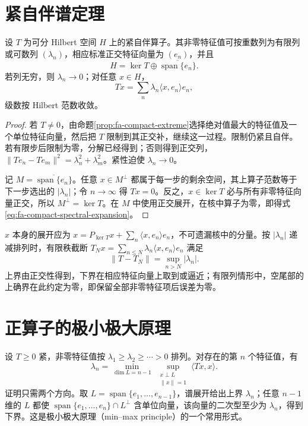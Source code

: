 \section{紧自伴谱定理}
\begin{theorem}\label{thm:fa-compact-spectral}
设 $T$ 为可分 Hilbert 空间 $H$ 上的紧自伴算子。其非零特征值可按重数列为有限列或可数列 $(\lambda_n)$，相应标准正交特征向量为 $(e_n)$，并且
\[
 H=\ker T\oplus\overline{\operatorname{span}\{e_n\}}.
\]
若列无穷，则 $\lambda_n\to0$；对任意 $x\in H$，
\begin{equation}
 Tx=\sum_n\lambda_n\langle x,e_n\rangle e_n,
 \label{eq:fa-compact-spectral-expansion}
\end{equation}
级数按 Hilbert 范数收敛。
\end{theorem}
\begin{proof}
若 $T\ne0$，由命题\ref{prop:fa-compact-extreme}选择绝对值最大的特征值及一个单位特征向量，然后把 $T$ 限制到其正交补，继续这一过程。限制仍紧且自伴。若有限步后限制为零，分解已经得到；否则得到正交列，$\|Te_n-Te_m\|^2=\lambda_n^2+\lambda_m^2$。紧性迫使 $\lambda_n\to0$。

记 $M=\overline{\operatorname{span}\{e_n\}}$。任意 $x\in M^\perp$ 都属于每一步的剩余空间，其上算子范数等于下一步选出的 $|\lambda_n|$；令 $n\to\infty$ 得 $Tx=0$。反之，$x\in\ker T$ 必与所有非零特征向量正交，所以 $M^\perp=\ker T$。在 $M$ 中使用正交展开，在核中算子为零，即得式\eqref{eq:fa-compact-spectral-expansion}。
\end{proof}
$x$ 本身的展开应为 $x=P_{\ker T}x+\sum_n\langle x,e_n\rangle e_n$，不可遗漏核中的分量。按 $|\lambda_n|$ 递减排列时，有限秩截断 $T_Nx=\sum_{n\leq N}\lambda_n\langle x,e_n\rangle e_n$ 满足
\[
 \|T-T_N\|=\sup_{n>N}|\lambda_n|.
\]
上界由正交性得到，下界在相应特征向量上取到或逼近；有限列情形中，空尾部的上确界在此约定为零，即保留全部非零特征项后误差为零。

\section{正算子的极小极大原理}
设 $T\geq0$ 紧，非零特征值按 $\lambda_1\geq\lambda_2\geq\cdots>0$ 排列。对存在的第 $n$ 个特征值，有
\[
 \lambda_n=\min_{\dim L=n-1}\ \sup_{\substack{x\perp L\\\|x\|=1}}
 \langle Tx,x\rangle.
\]
证明只需两个方向。取 $L=\operatorname{span}\{e_1,\ldots,e_{n-1}\}$，谱展开给出上界 $\lambda_n$；任意 $n-1$ 维的 $L$ 都使 $\operatorname{span}\{e_1,\ldots,e_n\}\cap L^\perp$ 含单位向量，该向量的二次型至少为 $\lambda_n$，得到下界。这是极小极大原理（min--max principle）的一个常用形式。

